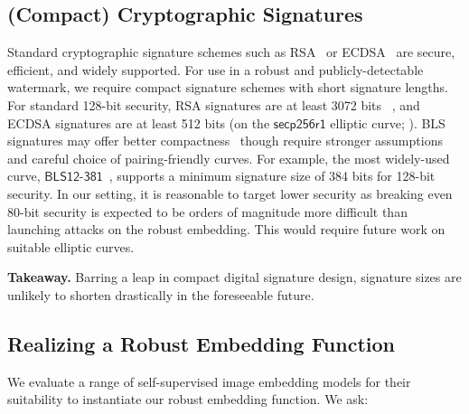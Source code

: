 \documentclass[12pt]{article}
\begin{document}
\subsection{(Compact) Cryptographic Signatures}

Standard cryptographic signature schemes such as RSA~\citep{rivest1978method} or ECDSA~\citep{johnson2001elliptic} are secure, efficient, and widely supported.
For use in a robust and publicly-detectable watermark, we require compact signature schemes with short signature lengths.
For standard 128-bit security, RSA signatures are at least 3072 bits ~\citep{elaine2016recommendation}, and ECDSA signatures are at least 512 bits (on the $\mathsf{secp256r1}$ elliptic curve; \citealp{certicom2010sec2}).
BLS signatures may offer better compactness~\citep{boneh2001short} though require stronger assumptions and careful choice of pairing-friendly curves.
For example, the most widely-used curve, $\mathsf{BLS12\text{-}381}$~\citep{barreto2003constructing}, supports a minimum signature size of 384 bits for 128-bit security.
In our setting, it is reasonable to target lower security as breaking even 80-bit security is expected to be orders of magnitude more difficult than launching attacks on the robust embedding.
This would require future work on suitable elliptic curves.

\begin{tcolorbox}[colback=gray!10!white,leftrule=2.5mm,size=title]
\textbf{Takeaway.} Barring a leap in compact digital signature design, signature sizes are unlikely to shorten drastically in the foreseeable future.
\end{tcolorbox}

\subsection{Realizing a Robust Embedding Function}

We evaluate a range of self-supervised image embedding models for their suitability to instantiate our robust embedding function.
We ask:
\end{document}
